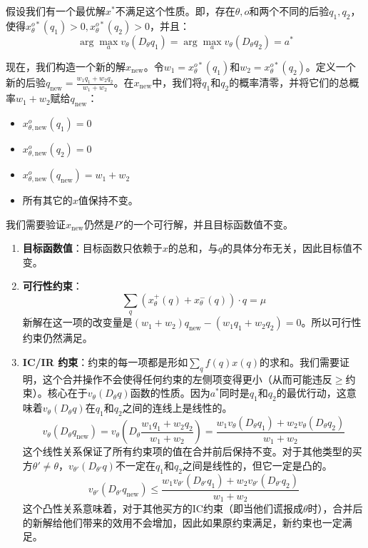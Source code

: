 假设我们有一个最优解$x^*$不满足这个性质。即，存在$\theta,o$和两个不同的后验$q_1,q_2$，使得$x_{\theta}^{o*}(q_1)>0, x_{\theta}^{o*}(q_2)>0$，并且：
$$\arg \max_{a} v_{\theta}(D_{\theta}q_1)=\arg\max_{a}v_{\theta}(D_{\theta}q_2)=a^*$$

现在，我们构造一个新的解$x_{\text{new}}$。令$w_1=x_{\theta}^{o*}(q_1)$和$w_2=x_{\theta}^{o*}(q_2)$。定义一个新的后验$q_{\text{new}} = \frac{w_1 q_1 + w_2 q_2}{w_1 + w_2}$。在$x_{\text{new}}$中，我们将$q_1$和$q_2$的概率清零，并将它们的总概率$w_1 + w_2$赋给$q_{\text{new}}$：

\begin{itemize}
    \item $x_{\theta,\text{new}}^{o}(q_1) = 0$
    \item $x_{\theta,\text{new}}^{o}(q_2) = 0$
    \item $x_{\theta,\text{new}}^{o}(q_{\text{new}}) = w_1 + w_2$
    \item 所有其它的$x$值保持不变。
\end{itemize}

我们需要验证$x_{\text{new}}$仍然是$P'$的一个可行解，并且目标函数值不变。

\begin{enumerate}
    \item \textbf{目标函数值}：目标函数只依赖于$x$的总和，与$q$的具体分布无关，因此目标值不变。
    \item \textbf{可行性约束}：$$\sum\limits_{q}\left(x_{\theta}^{+}(q)+x_{\theta}^{-}(q)\right)\cdot q = \mu$$ 新解在这一项的改变量是$(w_1 + w_2) q_{\text{new}} - (w_1 q_1 + w_2 q_2) = 0$。所以可行性约束仍然满足。
    \item \textbf{IC/IR 约束}：约束的每一项都是形如$\sum\limits_{q}f(q)x(q)$的求和。我们需要证明，这个合并操作不会使得任何约束的左侧项变得更小（从而可能违反$\geq$约束）。核心在于$v_\theta(D_\theta q)$函数的性质。因为$a^*$同时是$q_1$和$q_2$的最优行动，这意味着$v_\theta(D_\theta q)$在$q_1$和$q_2$之间的连线上是线性的。$$v_{\theta}(D_{\theta} q_{\text{new}}) = v_{\theta} \left(D_{\theta} \frac{w_1 q_1 + w_2 q_2}{w_1 + w_2}\right) = \frac{w_1 v_{\theta}(D_{\theta} q_1) + w_2 v_{\theta}(D_{\theta} q_2)}{w_1 + w_2}$$ 这个线性关系保证了所有约束项的值在合并前后保持不变。对于其他类型的买方$\theta' \neq \theta$，$v_{\theta'}(D_{\theta'} q)$不一定在$q_1$和$q_2$之间是线性的，但它一定是凸的。$$v_{\theta'}(D_{\theta'} q_{\text{new}})\leq \frac{w_1 v_{\theta'}(D_{\theta'}q_1) + w_2 v_{\theta'}(D_{\theta'}q_2)}{w_1 + w_2}$$ 这个凸性关系意味着，对于其他买方的IC约束（即当他们谎报成$\theta$时），合并后的新解给他们带来的效用不会增加，因此如果原约束满足，新约束也一定满足。
\end{enumerate}

